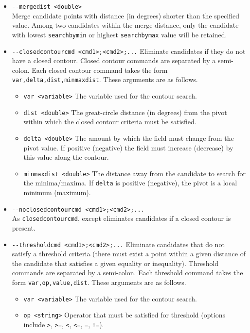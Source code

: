 \documentclass[gmdd, hvmath]{copernicus}
\begin{document}
\begin{itemize}
\item[] \texttt{-\;\!\!-mergedist <double>} \\ Merge candidate points with distance (in degrees) shorter than the specified value.  Among two candidates within the merge distance, only the candidate with lowest \texttt{searchbymin} or highest \texttt{searchbymax} value will be retained. 
\item[] \texttt{-\;\!\!-closedcontourcmd <cmd1>;<cmd2>;...} Eliminate candidates if they do not have a closed contour.  Closed contour commands are separated by a semi-colon.  Each closed contour command takes the form \texttt{var,delta,dist,minmaxdist}.  These arguments are as follows.
\begin{itemize}
\item[] \texttt{var <variable>}  The variable used for the contour search.
\item[] \texttt{dist <double>}  The great-circle distance (in degrees) from the pivot within which the closed contour criteria must be satisfied.
\item[] \texttt{delta <double>}  The amount by which the field must change from the pivot value.  If positive (negative) the field must increase (decrease) by this value along the contour.
\item[] \texttt{minmaxdist <double>}  The distance away from the candidate to search for the minima/maxima.  If \texttt{delta} is positive (negative), the pivot is a local minimum (maximum).
\end{itemize}
\item[] \texttt{-\;\!\!-noclosedcontourcmd <cmd1>;<cmd2>;...} \\ As \texttt{closedcontourcmd}, except eliminates candidates if a closed contour is present.
\item[] \texttt{-\;\!\!-thresholdcmd <cmd1>;<cmd2>;...}  Eliminate candidates that do not satisfy a threshold criteria (there must exist a point within a given distance of the candidate that satisfies a given equality or inequality).  Threshold commands are separated by a semi-colon.  Each threshold command takes the form \texttt{var,op,value,dist}.  These arguments are as follows.
\begin{itemize}
\item[] \texttt{var <variable>}  The variable used for the contour search.
\item[] \texttt{op <string>}  Operator that must be satisfied for threshold (options include \texttt{>}, \texttt{>=}, \texttt{<}, \texttt{<=}, \texttt{=}, \texttt{!=}).

\end{itemize}
\end{itemize}
\end{document}
